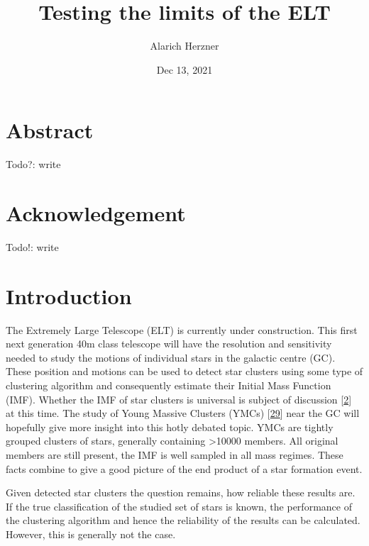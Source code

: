 \documentclass[letterpaper,10pt,english]{sphinxmanual}
\title{Testing the limits of the ELT}
\date{Dec 13, 2021}
\author{Alarich Herzner}
\begin{document}
\begin{figure}[htbp]
\centering
\capstart

\noindent{}

\end{figure}


\pagestyle{empty}
\sphinxmaketitle
\pagestyle{plain}
\sphinxtableofcontents
\pagestyle{normal}
\label{\detokenize{index::doc}}


\chapter{Abstract}
\label{\detokenize{NBodySimulation/Abstract:abstract}}\label{\detokenize{NBodySimulation/Abstract::doc}}
\sphinxAtStartPar
Todo?: write


\chapter{Acknowledgement}
\label{\detokenize{NBodySimulation/Acknowledgement:acknowledgement}}\label{\detokenize{NBodySimulation/Acknowledgement::doc}}
\sphinxAtStartPar
Todo!: write


\chapter{Introduction}
\label{\detokenize{NBodySimulation/Introduction:introduction}}\label{\detokenize{NBodySimulation/Introduction::doc}}
\sphinxAtStartPar
The Extremely Large Telescope (ELT) is currently under construction.
This first next generation 40m class telescope will have the resolution and sensitivity needed to study the motions of individual stars in the galactic centre (GC).
These position and motions can be used to detect star clusters using some type of clustering algorithm and consequently estimate their Initial Mass Function (IMF).
Whether the IMF of star clusters is universal is subject of discussion {[}\hyperlink{cite.NBodySimulation/Appendix:id45}{2}{]} at this time.
The study of Young Massive Clusters (YMCs) {[}\hyperlink{cite.NBodySimulation/Appendix:id56}{29}{]} near the GC will hopefully give more insight into this hotly debated topic.
YMCs are tightly grouped clusters of stars, generally containing \textgreater{}10000 members.
All original members are still present, the IMF is well sampled in all mass regimes. These facts combine to give a good picture of the end product of a star formation event.

\sphinxAtStartPar
Given detected star clusters the question remains, how reliable these results are.
If the true classification of the studied set of stars is known, the performance of the clustering algorithm and hence the reliability of the results can be calculated.
However, this is generally not the case.
\end{document}
